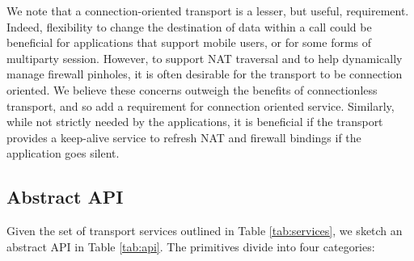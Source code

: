 \documentclass[10pt]{sig-alternate-05-2015}
\begin{document}
We note that a connection-oriented transport is a lesser, but useful,
requirement.
Indeed, flexibility to
change the destination of data within a call could be beneficial for
applications that support mobile users, or for some forms of multiparty session.
However, to support NAT traversal and to help dynamically manage firewall
pinholes, it is often desirable for the transport to be connection oriented. We
believe these concerns outweigh the benefits of connectionless transport, and so
add a requirement for connection oriented service. Similarly, while not strictly
needed by the applications, it is beneficial if the transport provides a
keep-alive service to refresh NAT and firewall bindings if the application goes
silent.

\subsection{Abstract API}

Given the set of transport services outlined in Table \ref{tab:services},
we sketch an abstract API in  Table \ref{tab:api}. The primitives divide
into four categories:
\end{document}
